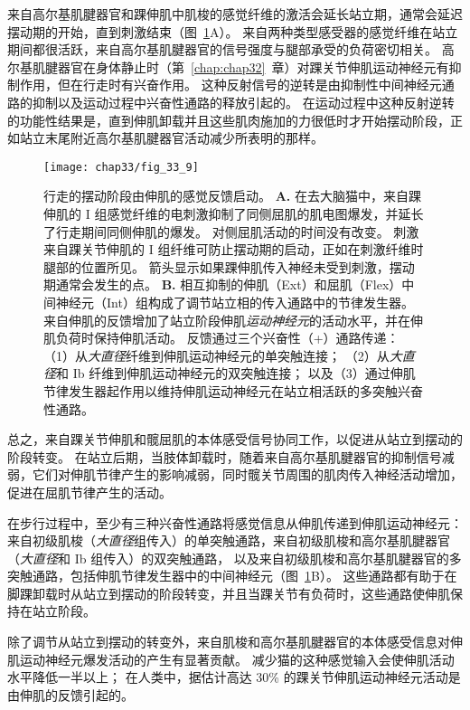 来自高尔基肌腱器官和踝伸肌中肌梭的感觉纤维的激活会延长站立期，通常会延迟摆动期的开始，直到刺激结束（图~\ref{fig:33_9}A）。
来自两种类型感受器的感觉纤维在站立期间都很活跃，来自高尔基肌腱器官的信号强度与腿部承受的负荷密切相关。
高尔基肌腱器官在身体静止时（第~\ref{chap:chap32}~章）对踝关节伸肌运动神经元有抑制作用，但在行走时有兴奋作用。
这种反射信号的逆转是由抑制性中间神经元通路的抑制以及运动过程中兴奋性通路的释放引起的。
在运动过程中这种反射逆转的功能性结果是，直到伸肌卸载并且这些肌肉施加的力很低时才开始摆动阶段，正如站立末尾附近高尔基肌腱器官活动减少所表明的那样。


\begin{figure}[htbp]
	\centering
	\texttt{[image: chap33/fig\_33\_9]}
	\caption{行走的摆动阶段由伸肌的感觉反馈启动。
		\textbf{A.} 在去大脑猫中，来自踝伸肌的 I 组感觉纤维的电刺激抑制了同侧屈肌的肌电图爆发，并延长了行走期间同侧伸肌的爆发。
		对侧屈肌活动的时间没有改变。
		刺激来自踝关节伸肌的 I 组纤维可防止摆动期的启动，正如在刺激纤维时腿部的位置所见。
		箭头显示如果踝伸肌传入神经未受到刺激，摆动期通常会发生的点\cite{whelan1995stimulation}。
		\textbf{B.} 相互抑制的伸肌（Ext）和屈肌（Flex）中间神经元（Int）组构成了调节站立相的传入通路中的节律发生器。
		来自伸肌的反馈增加了站立阶段伸肌\textit{运动神经元}的活动水平，并在伸肌负荷时保持伸肌活动。
		反馈通过三个兴奋性（+）通路传递：
		（1）从\textit{大直径}纤维到伸肌运动神经元的单突触连接；
		（2）从\textit{大直径}和 Ib 纤维到伸肌运动神经元的双突触连接；
		以及（3）通过伸肌节律发生器起作用以维持伸肌运动神经元在站立相活跃的多突触兴奋性通路。}
	\label{fig:33_9}
\end{figure}


总之，来自踝关节伸肌和髋屈肌的本体感受信号协同工作，以促进从站立到摆动的阶段转变。
在站立后期，当肢体卸载时，随着来自高尔基肌腱器官的抑制信号减弱，它们对伸肌节律产生的影响减弱，同时髋关节周围的肌肉传入神经活动增加，促进在屈肌节律产生的活动。


在步行过程中，至少有三种兴奋性通路将感觉信息从伸肌传递到伸肌运动神经元：
来自初级肌梭（\textit{大直径}组传入）的单突触通路，来自初级肌梭和高尔基肌腱器官（\textit{大直径}和 Ib 组传入）的双突触通路， 以及来自初级肌梭和高尔基肌腱器官的多突触通路，包括伸肌节律发生器中的中间神经元（图~\ref{fig:33_9}B）。
这些通路都有助于在脚踝卸载时从站立到摆动的阶段转变，并且当踝关节有负荷时，这些通路使伸肌保持在站立阶段。


除了调节从站立到摆动的转变外，来自肌梭和高尔基肌腱器官的本体感受信息对伸肌运动神经元爆发活动的产生有显著贡献。
减少猫的这种感觉输入会使伸肌活动水平降低一半以上；
在人类中，据估计高达 30\% 的踝关节伸肌运动神经元活动是由伸肌的反馈引起的。




